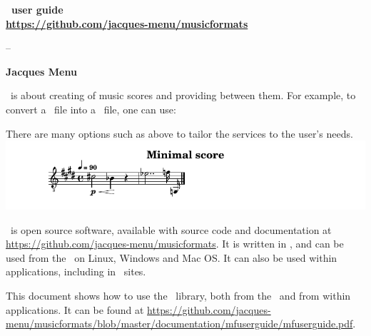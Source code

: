 \documentclass[11pt,a4paper]{report}
\begin{document}
\begin{titlepage}
  \begin{center}
    \vspace*{2cm}

    \textbf{
      \LARGE{\mf\ user guide} \\[10pt]
			\Large{\url{https://github.com/jacques-menu/musicformats}}
		}

    \vspace{0.25cm}

    \large{
			-- %
    	
		}

    \vspace{0.75cm}

    \large{\textbf{Jacques Menu}}
  \end{center}

  \vspace{1cm}


\mf\ is about creating  of music scores and providing  between them. For example, to convert a \mxml\ file into a \lily\ file, one can use:

\begin{center}
\end{center}
There are many options such as  above to tailor the services to the user's needs. \\
\includegraphics[scale=.8]{../mfgraphics/MinimalScore.png}

\mf\ is open source software, available with source code and documentation at \url{https://github.com/jacques-menu/musicformats}. It is written in \CPlusplus, and can be used from the \CLI\ on Linux, Windows and Mac OS. It can also be used within applications, including in \Web\ sites.

This document shows how to use the \mf\ library, both from the \CLI\ and from within applications.
It can be found at \url{https://github.com/jacques-menu/musicformats/blob/master/documentation/mfuserguide/mfuserguide.pdf}.


\end{titlepage}
\end{document}
